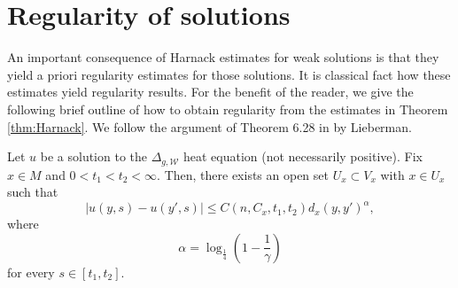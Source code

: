\documentclass[AMS,STIX1COL]{WileyNJD-v2}
\numberwithin{equation}{section}
\renewcommand{\~}{\tilde}
\renewcommand{\-}{\bar}
\newcommand{\8}{\infty}
\newcommand{\cW}{\mathcal{W}}
\newcommand{\cbrac}[1]{\left(#1\right)}
\newcommand{\modulus}[1]{|#1|}
\begin{document}
\section{Regularity of solutions}

An important consequence of Harnack estimates for weak 
solutions is that they yield a priori regularity estimates
for those solutions. It is classical fact how these estimates
yield regularity results. For the benefit of the reader, 
we give the following brief outline of how to obtain
regularity from the estimates in Theorem \ref{thm:Harnack}.
We follow the argument of Theorem 6.28 in 
\cite{Lieberman} by Lieberman.

\begin{prop}
Let $u$ be a solution to the $\Delta_{g,\cW}$
heat equation (not necessarily positive).
Fix $x \in M$ and $0 < t_1 < t_2 < \infty$.
Then, there exists an open set $U_x \subset V_x$ 
with $x \in U_x$
such that 
$$ \modulus{u(y,s) - u(y',s)} \leq C(n, C_x, t_1, t_2) d_x(y, y')^\alpha,$$
where 
$$ \alpha = \log_{\frac{1}{4}}\cbrac{1 - \frac{1}{\gamma}}$$
for every $s \in [t_1, t_2]$.
\end{prop}
\end{document}
